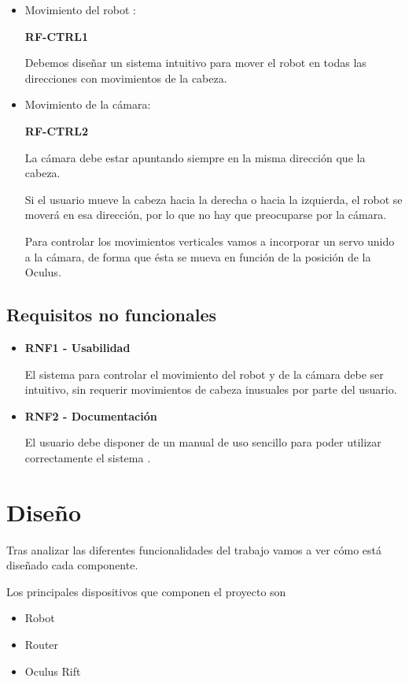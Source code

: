 \documentclass[twoside, 12pt]{epstfg}
\begin{document}
\begin{itemize}
	\item Movimiento del robot :
	
	\textbf{RF-CTRL1}
	
	Debemos diseñar un sistema intuitivo para mover el robot en todas las direcciones con movimientos de la cabeza.
	\item  Movimiento de la cámara:
	
	\textbf{RF-CTRL2}
	
	La cámara debe estar apuntando siempre en la misma dirección que la cabeza.
	
	Si el usuario mueve la cabeza hacia la derecha o hacia la izquierda, el robot se moverá en esa dirección, por lo que no hay que preocuparse por la cámara.
	
	Para controlar los movimientos verticales vamos a incorporar un servo unido a la cámara, de forma que ésta se mueva en función de la posición de la Oculus. 
\end{itemize}


\subsection{Requisitos no funcionales}

\begin{itemize}
	\item \textbf{RNF1 - Usabilidad}
	
	
	El sistema para controlar el movimiento del robot y de la cámara debe ser intuitivo, sin requerir movimientos de cabeza inusuales por parte del usuario.
	
	
	
	\item \textbf{RNF2 - Documentación}
	
	El usuario debe disponer de un manual de uso sencillo para poder utilizar correctamente el sistema .
\end{itemize}

\newpage
\section{Diseño}

Tras analizar las diferentes funcionalidades del trabajo vamos a ver cómo está diseñado cada componente.

Los principales dispositivos que componen el proyecto son 
\begin{itemize}
	\item Robot
	\item Router
	\item Oculus Rift
\end{itemize}
\end{document}
